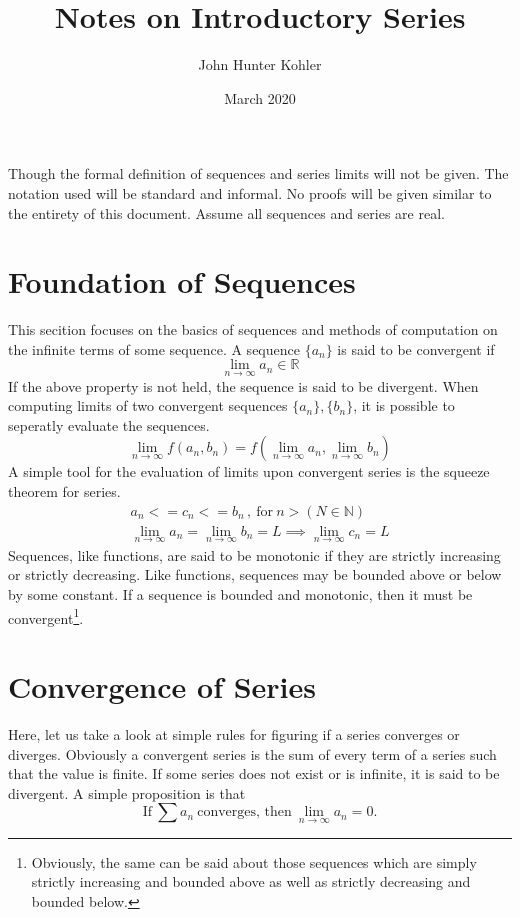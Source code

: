 \documentclass[11pt]{article}
\title{Notes on Introductory Series}
\author{John Hunter Kohler}
\date{March 2020}
\newcommand{\inreal}{\in\mathbb{R}}
\newcommand{\innat}{\in\mathbb{N}}
\begin{document}
\maketitle

\quad Though the formal definition of sequences and series limits will not be given. The notation used will be standard and 
informal. No proofs will be given similar to the entirety of this document. Assume all sequences and series are real.

\section*{Foundation of Sequences}
	This secition focuses on the basics of sequences and methods of computation on the infinite terms of some sequence. 
	A sequence $\{a_n\}$ is said to be convergent if
		\begin{equation}
			\lim_{n\to\infty} a_n \inreal
		\end{equation}
	If the above property is not held, the sequence is said to be divergent. When computing limits of two 
	convergent sequences $\{a_n\},\{b_n\}$, it is possible to seperatly evaluate the sequences.
		\begin{equation}
			\lim_{n\to\infty} f(a_n,b_n) = f(\lim_{n\to\infty} a_n, \lim_{n\to\infty} b_n)
		\end{equation}
	A simple tool for the evaluation of limits upon convergent series is the squeeze theorem for series.
		\begin{gather}
			a_n <= c_n <= b_n\,,\ \text{for} \ n > (N\innat) \\ 
			\lim_{n\to\infty} a_n = \lim_{n\to\infty} b_n = L
			\implies \lim_{n\to\infty} c_n = L
		\end{gather}
	Sequences, like functions, are said to be monotonic if they are strictly increasing or strictly decreasing.
	Like functions, sequences may be bounded above or below by some constant. If a sequence is bounded and monotonic, 
	then it must be convergent\footnote{Obviously, the same can be said about those sequences which are simply strictly increasing and 
	bounded above as well as strictly decreasing and bounded below.}.

\section*{Convergence of Series}
	Here, let us take a look at simple rules for figuring if a series converges or diverges. Obviously a convergent series is the sum of
	every term of a series such that the value is finite. If some series does not exist or is infinite, it is said to be divergent.
	A simple proposition is that
		\begin{equation}
			\text{If} \ \sum a_n \ \text{converges, then} \ \lim_{n\to\infty} a_n = 0.
		\end{equation}
\end{document}
